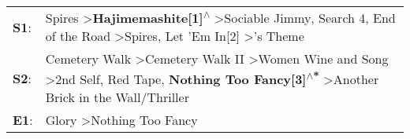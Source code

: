 \begin{supertabular}{p{0.03\textwidth}p{0.92\textwidth}}
 \textbf{S1}:  &    Spires\textsuperscript{} \textgreater \enspace \textbf{Hajimemashite[1]\textsuperscript{$\wedge$}} \textgreater \enspace Sociable Jimmy\textsuperscript{}, \enspace Search 4\textsuperscript{}, \enspace End of the Road\textsuperscript{} \textgreater \enspace Spires\textsuperscript{}, \enspace Let 'Em In[2]\textsuperscript{} \textgreater {}'s Theme\textsuperscript{}  \enspace  \\
 \textbf{S2}:  &  Cemetery Walk\textsuperscript{} \textgreater \enspace Cemetery Walk II\textsuperscript{} \textgreater \enspace Women Wine and Song\textsuperscript{} \textgreater \enspace 2nd Self\textsuperscript{}, \enspace Red Tape\textsuperscript{}, \enspace \textbf{Nothing Too Fancy[3]\textsuperscript{$\wedge$*}} \textgreater \enspace Another Brick in the Wall/Thriller\textsuperscript{}  \enspace  \\
 \textbf{E1}:  &                                                                                                                                                                                                                                                                                                         Glory\textsuperscript{} \textgreater \enspace Nothing Too Fancy\textsuperscript{}  \enspace  \\
\end{supertabular}
